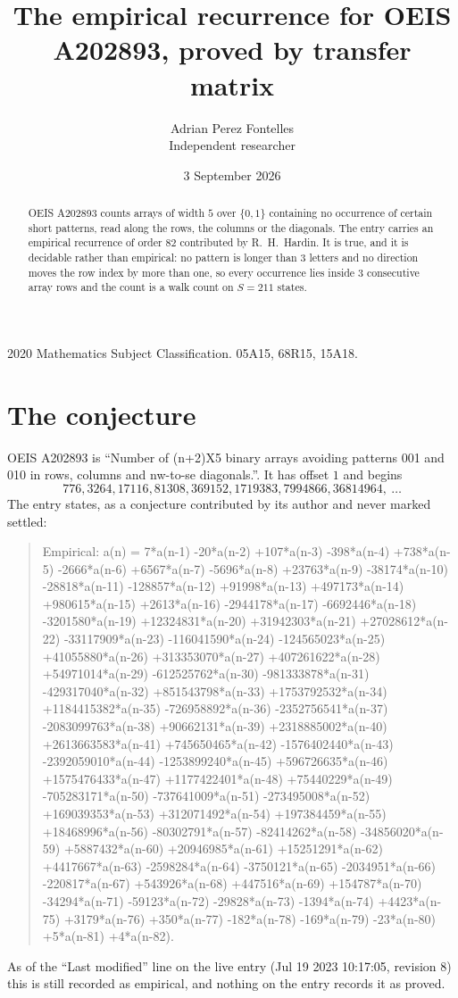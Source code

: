 \documentclass[11pt,a4paper]{article}
\title{The empirical recurrence for OEIS A202893, proved by transfer matrix}
\author{Adrian Perez Fontelles\\ \small Independent researcher}
\date{3 September 2026}
\theoremstyle{plain}
\theoremstyle{definition}
\begin{document}
\maketitle

\begin{abstract}
OEIS A202893 counts arrays of width $5$ over $\{0,1\}$ containing no occurrence of certain short
patterns, read along the rows, the columns or the diagonals. The entry carries an empirical
recurrence of order $82$ contributed by R.~H.~Hardin. It is true, and it is decidable
rather than empirical: no pattern is longer than $3$ letters and no direction moves the row
index by more than one, so every occurrence lies inside $3$ consecutive array rows and the
count is a walk count on $S=211$ states.
\end{abstract}

\noindent\small 2020 Mathematics Subject Classification. 05A15, 68R15, 15A18.\normalsize

\section{The conjecture}

OEIS A202893 is ``Number of (n+2)X5 binary arrays avoiding patterns 001 and 010 in rows, columns and nw-to-se diagonals.''. It has offset $1$ and begins
\[
776, 3264, 17116, 81308, 369152, 1719383, 7994866, 36814964,\ \dots
\]
The entry states, as a conjecture contributed by its author and never marked settled:
\begin{quote}
Empirical: a(n) = 7*a(n-1) -20*a(n-2) +107*a(n-3) -398*a(n-4) +738*a(n-5) -2666*a(n-6) +6567*a(n-7) -5696*a(n-8) +23763*a(n-9) -38174*a(n-10) -28818*a(n-11) -128857*a(n-12) +91998*a(n-13) +497173*a(n-14) +980615*a(n-15) +2613*a(n-16) -2944178*a(n-17) -6692446*a(n-18) -3201580*a(n-19) +12324831*a(n-20) +31942303*a(n-21) +27028612*a(n-22) -33117909*a(n-23) -116041590*a(n-24) -124565023*a(n-25) +41055880*a(n-26) +313353070*a(n-27) +407261622*a(n-28) +54971014*a(n-29) -612525762*a(n-30) -981333878*a(n-31) -429317040*a(n-32) +851543798*a(n-33) +1753792532*a(n-34) +1184415382*a(n-35) -726958892*a(n-36) -2352756541*a(n-37) -2083099763*a(n-38) +90662131*a(n-39) +2318885002*a(n-40) +2613663583*a(n-41) +745650465*a(n-42) -1576402440*a(n-43) -2392059010*a(n-44) -1253899240*a(n-45) +596726635*a(n-46) +1575476433*a(n-47) +1177422401*a(n-48) +75440229*a(n-49) -705283171*a(n-50) -737641009*a(n-51) -273495008*a(n-52) +169039353*a(n-53) +312071492*a(n-54) +197384459*a(n-55) +18468996*a(n-56) -80302791*a(n-57) -82414262*a(n-58) -34856020*a(n-59) +5887432*a(n-60) +20946985*a(n-61) +15251291*a(n-62) +4417667*a(n-63) -2598284*a(n-64) -3750121*a(n-65) -2034951*a(n-66) -220817*a(n-67) +543926*a(n-68) +447516*a(n-69) +154787*a(n-70) -34294*a(n-71) -59123*a(n-72) -29828*a(n-73) -1394*a(n-74) +4423*a(n-75) +3179*a(n-76) +350*a(n-77) -182*a(n-78) -169*a(n-79) -23*a(n-80) +5*a(n-81) +4*a(n-82).
\end{quote}
As of the ``Last modified'' line on the live entry (Jul 19 2023 10:17:05, revision 8) this is still
recorded as empirical, and nothing on the entry records it as proved.
\end{document}
